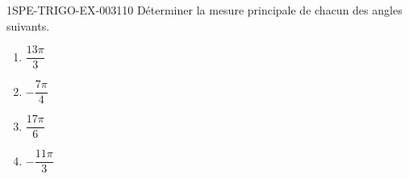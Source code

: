 \begin{exercice}{1SPE-TRIGO-EX-003}{1}{10}
Déterminer la mesure principale de chacun des angles suivants.
\begin{enumerate}
  \item $\dfrac{13\pi}{3}$
  \item $-\dfrac{7\pi}{4}$
  \item $\dfrac{17\pi}{6}$
  \item $-\dfrac{11\pi}{3}$
\end{enumerate}
\end{exercice}
